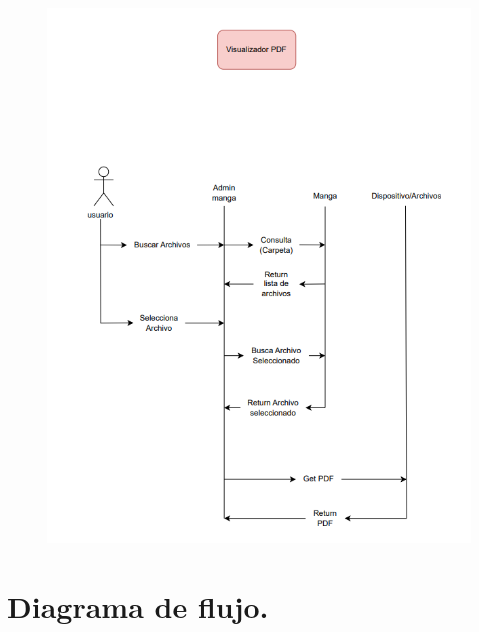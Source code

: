 \documentclass[12pt]{article}
\begin{document}
\begin{figure}[htbp]
	\centering
		\includegraphics[width=1.00\textwidth]{Screenshot 2023-10-05 114459.png}
	\label{fig:Screenshot 2023-10-05 114459}
\end{figure}

\newpage

\section{Diagrama de flujo.}
\end{document}
